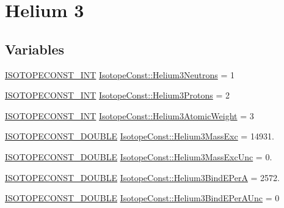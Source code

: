 \hypertarget{group___isotope_const-_helium-_he3}{}\section{Helium 3}
\label{group___isotope_const-_helium-_he3}
\subsection*{Variables}
\begin{DoxyCompactItemize}
\item 
\mbox{\hyperlink{group___isotope_const-_macros_ga5f18360b3e99483a35c32d789e62621c}{I\+S\+O\+T\+O\+P\+E\+C\+O\+N\+S\+T\+\_\+\+I\+NT}} \mbox{\hyperlink{group___isotope_const-_helium-_he3_ga7804b84fbf7df30ac09e9354c3977870}{Isotope\+Const\+::\+Helium3\+Neutrons}} = 1
\item 
\mbox{\hyperlink{group___isotope_const-_macros_ga5f18360b3e99483a35c32d789e62621c}{I\+S\+O\+T\+O\+P\+E\+C\+O\+N\+S\+T\+\_\+\+I\+NT}} \mbox{\hyperlink{group___isotope_const-_helium-_he3_ga16b1194f5a200cbb4782b7da75a4fd84}{Isotope\+Const\+::\+Helium3\+Protons}} = 2
\item 
\mbox{\hyperlink{group___isotope_const-_macros_ga5f18360b3e99483a35c32d789e62621c}{I\+S\+O\+T\+O\+P\+E\+C\+O\+N\+S\+T\+\_\+\+I\+NT}} \mbox{\hyperlink{group___isotope_const-_helium-_he3_ga6fee768b3c02d4130bdcfcd8a1d7ab0f}{Isotope\+Const\+::\+Helium3\+Atomic\+Weight}} = 3
\item 
\mbox{\hyperlink{group___isotope_const-_macros_ga8f45a7272ce02c0b4c65c44636ed719a}{I\+S\+O\+T\+O\+P\+E\+C\+O\+N\+S\+T\+\_\+\+D\+O\+U\+B\+LE}} \mbox{\hyperlink{group___isotope_const-_helium-_he3_ga63ae3659b49b0cb1a4dec3f0a4fdf26a}{Isotope\+Const\+::\+Helium3\+Mass\+Exc}} = 14931.
\item 
\mbox{\hyperlink{group___isotope_const-_macros_ga8f45a7272ce02c0b4c65c44636ed719a}{I\+S\+O\+T\+O\+P\+E\+C\+O\+N\+S\+T\+\_\+\+D\+O\+U\+B\+LE}} \mbox{\hyperlink{group___isotope_const-_helium-_he3_gacc1d485aa78c3cc417c3a9f4fa81bfd7}{Isotope\+Const\+::\+Helium3\+Mass\+Exc\+Unc}} = 0.
\item 
\mbox{\hyperlink{group___isotope_const-_macros_ga8f45a7272ce02c0b4c65c44636ed719a}{I\+S\+O\+T\+O\+P\+E\+C\+O\+N\+S\+T\+\_\+\+D\+O\+U\+B\+LE}} \mbox{\hyperlink{group___isotope_const-_helium-_he3_gafa47248d217aecaeb2cb0e0bd93c7365}{Isotope\+Const\+::\+Helium3\+Bind\+E\+PerA}} = 2572.
\item 
\mbox{\hyperlink{group___isotope_const-_macros_ga8f45a7272ce02c0b4c65c44636ed719a}{I\+S\+O\+T\+O\+P\+E\+C\+O\+N\+S\+T\+\_\+\+D\+O\+U\+B\+LE}} \mbox{\hyperlink{group___isotope_const-_helium-_he3_gaf63a348fe6bcdd249e127df64497c034}{Isotope\+Const\+::\+Helium3\+Bind\+E\+Per\+A\+Unc}} = 0

\end{DoxyCompactItemize}

